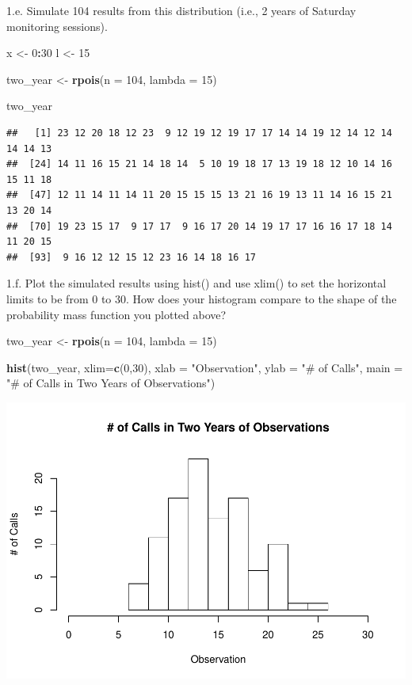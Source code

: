 \documentclass[]{article}
\newenvironment{Shaded}{\begin{snugshade}}{\end{snugshade}}
\newcommand{\KeywordTok}[1]{\textcolor[rgb]{0.13,0.29,0.53}{\textbf{#1}}}
\newcommand{\DataTypeTok}[1]{\textcolor[rgb]{0.13,0.29,0.53}{#1}}
\newcommand{\DecValTok}[1]{\textcolor[rgb]{0.00,0.00,0.81}{#1}}
\newcommand{\StringTok}[1]{\textcolor[rgb]{0.31,0.60,0.02}{#1}}
\newcommand{\OperatorTok}[1]{\textcolor[rgb]{0.81,0.36,0.00}{\textbf{#1}}}
\newcommand{\NormalTok}[1]{#1}
\begin{document}
1.e. Simulate 104 results from this distribution (i.e., 2 years of
Saturday monitoring sessions).

\begin{Shaded}
\begin{Highlighting}[]
\NormalTok{x <-}\StringTok{ }\DecValTok{0}\OperatorTok{:}\DecValTok{30}
\NormalTok{l <-}\StringTok{ }\DecValTok{15}

\NormalTok{two_year <-}\StringTok{ }\KeywordTok{rpois}\NormalTok{(}\DataTypeTok{n =} \DecValTok{104}\NormalTok{, }\DataTypeTok{lambda =} \DecValTok{15}\NormalTok{)}


\NormalTok{two_year}
\end{Highlighting}
\end{Shaded}

\begin{verbatim}
##   [1] 23 12 20 18 12 23  9 12 19 12 19 17 17 14 14 19 12 14 12 14 14 14 13
##  [24] 14 11 16 15 21 14 18 14  5 10 19 18 17 13 19 18 12 10 14 16 15 11 18
##  [47] 12 11 14 11 14 11 20 15 15 15 13 21 16 19 13 11 14 16 15 21 13 20 14
##  [70] 19 23 15 17  9 17 17  9 16 17 20 14 19 17 17 16 16 17 18 14 11 20 15
##  [93]  9 16 12 12 15 12 23 16 14 18 16 17
\end{verbatim}

1.f. Plot the simulated results using hist() and use xlim() to set the
horizontal limits to be from 0 to 30. How does your histogram compare to
the shape of the probability mass function you plotted above?

\begin{Shaded}
\begin{Highlighting}[]
\NormalTok{two_year <-}\StringTok{ }\KeywordTok{rpois}\NormalTok{(}\DataTypeTok{n =} \DecValTok{104}\NormalTok{, }\DataTypeTok{lambda =} \DecValTok{15}\NormalTok{)}

\KeywordTok{hist}\NormalTok{(two_year, }\DataTypeTok{xlim=}\KeywordTok{c}\NormalTok{(}\DecValTok{0}\NormalTok{,}\DecValTok{30}\NormalTok{), }\DataTypeTok{xlab =} \StringTok{"Observation"}\NormalTok{, }\DataTypeTok{ylab =} \StringTok{"# of Calls"}\NormalTok{, }\DataTypeTok{main =} \StringTok{"# of Calls in Two Years of Observations"}\NormalTok{)}
\end{Highlighting}
\end{Shaded}

\includegraphics{Locker-Angelina-ADA-Homework-02_files/figure-latex/unnamed-chunk-7-1.pdf}
\end{document}
